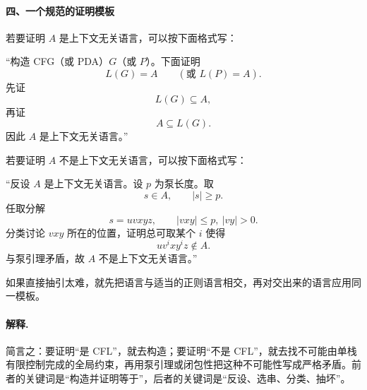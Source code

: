 \begin{answerred}
\begin{answernote}
\paragraph{四、一个规范的证明模板}
\medskip
\noindent
若要证明 $A$ 是上下文无关语言，可以按下面格式写：

\medskip
\noindent
“构造 CFG（或 PDA）$G$（或 $P$）。下面证明
\[
    L(G)=A
    \qquad
    (\text{或 }L(P)=A).
\]
先证
\[
    L(G)\subseteq A,
\]
再证
\[
    A\subseteq L(G).
\]
因此 $A$ 是上下文无关语言。”

\medskip
\noindent
若要证明 $A$ 不是上下文无关语言，可以按下面格式写：

\medskip
\noindent
“反设 $A$ 是上下文无关语言。设 $p$ 为泵长度。取
\[
    s\in A,\qquad |s|\ge p.
\]
任取分解
\[
    s=uvxyz,\qquad |vxy|\le p,\ |vy|>0.
\]
分类讨论 $vxy$ 所在的位置，证明总可取某个 $i$ 使得
\[
    uv^ixy^iz\notin A.
\]
与泵引理矛盾，故 $A$ 不是上下文无关语言。”

\medskip
如果直接抽引太难，就先把语言与适当的正则语言相交，再对交出来的语言应用同一模板。

\paragraph{解释.}
简言之：要证明“是 CFL”，就去构造；要证明“不是 CFL”，就去找不可能由单栈有限控制完成的全局约束，再用泵引理或闭包性把这种不可能性写成严格矛盾。前者的关键词是“构造并证明等于”，后者的关键词是“反设、选串、分类、抽坏”。
\end{answernote}
\end{answerred}

\clearpage
